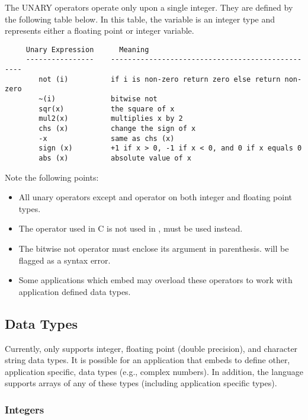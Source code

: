    The UNARY operators operate only upon a single integer.  They are defined
   by the following table below.  In this table, the variable  is an
   integer type and  represents either a floating point or integer
   variable. 
\begin{verbatim}
     Unary Expression      Meaning
     ----------------    -------------------------------------------------
        not (i)          if i is non-zero return zero else return non-zero
        ~(i)             bitwise not
        sqr(x)           the square of x
        mul2(x)          multiplies x by 2
        chs (x)          change the sign of x
        -x               same as chs (x)
        sign (x)         +1 if x > 0, -1 if x < 0, and 0 if x equals 0
        abs (x)          absolute value of x
\end{verbatim}
   Note the following points:
\begin{itemize}   
\item All unary operators except  and \var{\~{}} operator on both integer
      and floating point types.

\item The \var{!} operator used in C is not used in \slang{},   must be
      used instead.

\item The bitwise not operator \var{\~{}} must enclose its argument in
      parenthesis.   will be flagged as a syntax error.

\item Some applications which embed \slang{} may overload these operators
      to work with application defined data types.
\end{itemize}     

\subsection{Data Types}

   Currently, \slang{} only supports integer, floating point (double
   precision), and character string data types.  It is possible for an
   application that embeds \slang{} to define other, application specific,
   data types (e.g., complex numbers).   In addition, the language supports
   arrays of any of these types (including application specific types).
   
\subsubsection{Integers}
   
